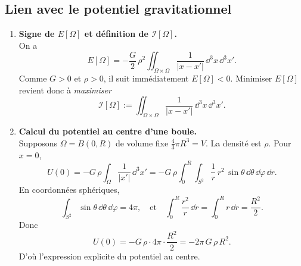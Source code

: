 \documentclass[a4paper,10pt]{report}
\begin{document}
		\subsection{Lien avec le potentiel gravitationnel}
		\begin{enumerate}
			\item \textbf{Signe de \(E[\Omega]\) et définition de \(\mathcal{I}[\Omega]\).}\\
			On a 
			\[
			E[\Omega] = -\frac{G}{2}\,\rho^2 
			\iint_{\Omega \times \Omega} \frac{1}{\lvert x - x' \rvert}\,\dd^3x\,\dd^3x'.
			\]
			Comme \(G>0\) et \(\rho>0\), il suit immédiatement \(E[\Omega] < 0\). 
			Minimiser \(E[\Omega]\) revient donc à \emph{maximiser} 
			\[
			\mathcal{I}[\Omega] 
			:= \iint_{\Omega \times \Omega} \frac{1}{\lvert x - x' \rvert}\,\dd^3x\,\dd^3x'.
			\]
			
			\item \textbf{Calcul du potentiel au centre d’une boule.}\\
			Supposons \(\Omega = B(0,R)\) de volume fixe 
			\(\tfrac{4}{3}\pi R^3 = V\). La densité est \(\rho\). Pour \(x=0\),
			\[
			U(0) = -G\,\rho 
			\int_{\Omega} \frac{1}{\lvert x' \rvert}\,\dd^3x'
			= -G\,\rho \int_{0}^{R} \int_{S^2} \frac{1}{r}\,r^2\,\sin\theta\,\dd\theta\,\dd\varphi\,\dd r.
			\]
			En coordonnées sphériques,
			\[
			\int_{S^2} \sin\theta\,\dd\theta\,\dd\varphi 
			= 4\pi, 
			\quad 
			\text{et} 
			\quad 
			\int_{0}^{R} \frac{r^2}{r}\,\dd r 
			= \int_{0}^{R} r\,\dd r 
			= \frac{R^2}{2}.
			\]
			Donc
			\[
			U(0) = -G\,\rho \cdot 4\pi \cdot \frac{R^2}{2}
			= -2\pi\,G\,\rho\,R^2.
			\]
			D’où l’expression explicite du potentiel au centre.
			
		\end{enumerate}
		
\end{document}
